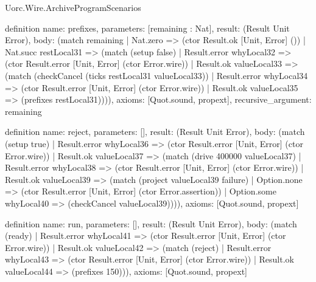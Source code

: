 \begin{lexlean}{Uorc.Wire.ArchiveProgramScenarios}
\begin{semanticmodule}
definition{
  name: prefixes,
  parameters: [remaining : Nat],
  result: (Result Unit Error),
  body: (match remaining
    | Nat.zero => (ctor Result.ok [Unit, Error] ())
    | Nat.succ restLocal31 => (match (setup false)
      | Result.error whyLocal32 => (ctor Result.error [Unit, Error] (ctor Error.wire))
      | Result.ok valueLocal33 => (match (checkCancel (ticks restLocal31 valueLocal33))
        | Result.error whyLocal34 => (ctor Result.error [Unit, Error] (ctor Error.wire))
        | Result.ok valueLocal35 => (prefixes restLocal31)))),
  axioms: [Quot.sound, propext],
  recursive_argument: remaining
}

definition{
  name: reject,
  parameters: [],
  result: (Result Unit Error),
  body: (match (setup true)
    | Result.error whyLocal36 => (ctor Result.error [Unit, Error] (ctor Error.wire))
    | Result.ok valueLocal37 => (match (drive 400000 valueLocal37)
      | Result.error whyLocal38 => (ctor Result.error [Unit, Error] (ctor Error.wire))
      | Result.ok valueLocal39 => (match (project valueLocal39 failure)
        | Option.none => (ctor Result.error [Unit, Error] (ctor Error.assertion))
        | Option.some whyLocal40 => (checkCancel valueLocal39)))),
  axioms: [Quot.sound, propext]
}

definition{
  name: run,
  parameters: [],
  result: (Result Unit Error),
  body: (match (ready)
    | Result.error whyLocal41 => (ctor Result.error [Unit, Error] (ctor Error.wire))
    | Result.ok valueLocal42 => (match (reject)
      | Result.error whyLocal43 => (ctor Result.error [Unit, Error] (ctor Error.wire))
      | Result.ok valueLocal44 => (prefixes 150))),
  axioms: [Quot.sound, propext]
}
\end{semanticmodule}
\end{lexlean}
